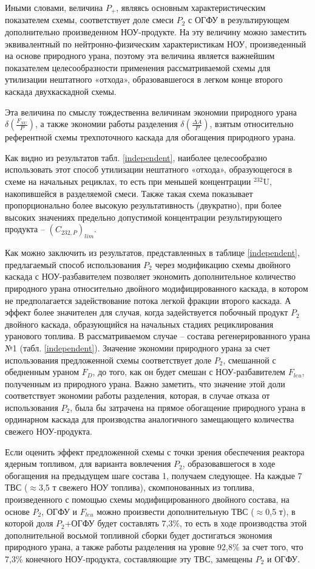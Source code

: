 Иными словами, величина $P_{+}$, являясь основным характеристическим показателем схемы, соответствует доле смеси $P_2$ с ОГФУ в результирующем дополнительно произведенном НОУ-продукте. На эту величину можно заместить эквивалентный по нейтронно-физическим характеристикам НОУ, произведенный на основе природного урана, поэтому эта величина является важнейшим показателем целесообразности применения рассматриваемой схемы для утилизации нештатного «отхода», образовавшегося в легком конце второго каскада двухкаскадной схемы.

Эта величина по смыслу тождественна величинам экономии природного урана $\delta(\frac{F_{NU}}{P})$, а также экономии работы разделения $\delta(\frac{\Delta A}{P})$, взятым относительно референтной схемы трехпоточного каскада для обогащения природного урана.

Как видно из результатов табл. \ref{independent}, наиболее целесообразно использовать этот способ утилизации нештатного «отхода», образующегося в схеме на начальных рециклах, то есть при меньшей концентрации $^{232}$U, накопившейся в разделяемой смеси. Также  такая схема показывает пропорционально более высокую результативность (двукратно), при более высоких значениях предельно допустимой концентрации результирующего продукта -- $(C_{232,P})_{lim}$.

Как можно заключить из результатов, представленных в таблице \ref{independent}, предлагаемый способ использования $P_2$ через модификацию схемы двойного каскада с НОУ-разбавителем позволяет экономить дополнительное количество природного урана относительно двойного модифицированного каскада, в котором не предполагается задействование потока легкой фракции второго каскада. А эффект более значителен для случая, когда задействуется побочный продукт $P_2$ двойного каскада, образующийся на начальных стадиях рециклирования уранового топлива. В рассматриваемом случае -- состава регенерированного урана №1 (табл. \ref{independent}). Значение экономии природного урана за счет использования предложенной схемы соответствует доле $P_2$, смешанной с обедненным ураном $F_D$, до того, как он будет смешан с НОУ-разбавителем $F_{leu}$, полученным из природного урана. Важно заметить, что значение этой доли соответствует экономии работы разделения, которая, в случае отказа от использования $P_2$, была бы затрачена на прямое обогащение природного урана в ординарном каскада для производства аналогичного замещающего количества свежего НОУ-продукта.

Если оценить эффект предложенной схемы с точки зрения обеспечения реактора ядерным топливом, для варианта вовлечения $P_2$, образовавшегося в ходе обогащения на предыдущем шаге состава 1, получаем следующее. На каждые 7 ТВС ($\approx$3,5 т свежего НОУ топлива), скомпонованных из топлива, произведенного с помощью схемы модифицированного двойного состава, на основе $P_2$, ОГФУ и $F_{leu}$ можно произвести дополнительную ТВС ($\approx$0,5 т), в которой доля $P_2$+ОГФУ будет составлять 7,3\%, то есть в ходе производства этой дополнительной восьмой топливной сборки будет достигаться экономия природного урана, а также работы разделения на уровне 92,8\% за счет того, что 7,3\% конечного НОУ-продукта, составляющие эту ТВС, замещены $P_2$ и ОГФУ.

